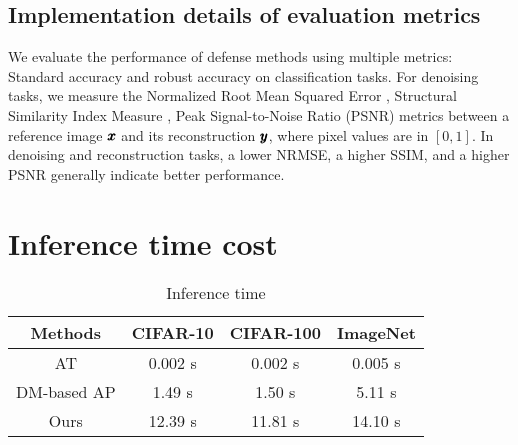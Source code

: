 \subsection{Implementation details of evaluation metrics}

We evaluate the performance of defense methods using multiple metrics: Standard accuracy and robust accuracy \citep{szegedy2013intriguing} on classification tasks. For denoising tasks, we measure the Normalized Root Mean Squared Error \citep[NRMSE,][]{botchkarev2018performance}, Structural Similarity Index Measure \citep[SSIM,][]{hore2010image}, Peak Signal-to-Noise Ratio (PSNR) metrics between a reference image $\pmb{x}$ and its reconstruction $\pmb{y}$, where pixel values are in $[0,1]$.
In denoising and reconstruction tasks, a lower NRMSE, a higher SSIM, and a higher PSNR generally indicate better performance.







\section{Inference time cost}
\begin{table}[htbp]
\centering
\caption{Inference time}
\vskip 0.15in
\label{tab:inference-time}
\begin{tabular}{cccc}
\toprule
Methods & CIFAR-10 & CIFAR-100 & ImageNet \\
\midrule
AT & 0.002 s & 0.002 s & 0.005 s \\
DM-based AP & 1.49 s & 1.50 s & 5.11 s \\
Ours & 12.39 s & 11.81 s & 14.10 s \\
\bottomrule
\bottomrule
\end{tabular}
\vskip -0.1in
\end{table}


